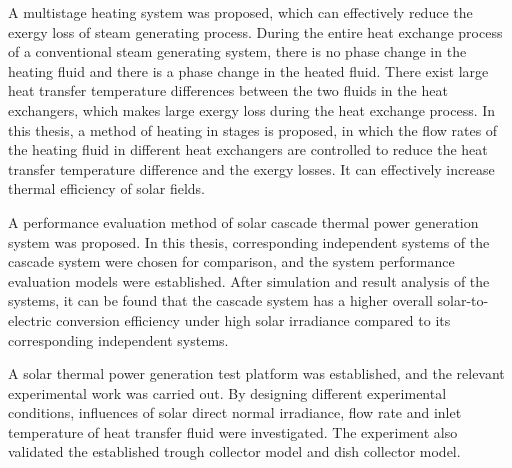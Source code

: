 {A multistage heating system was proposed, which can effectively reduce the exergy loss of steam generating process. During the entire heat exchange process of a conventional steam generating system, there is no phase change in the heating fluid and there is a phase change in the heated fluid. There exist large heat transfer temperature differences between the two fluids in the heat exchangers, which makes large exergy loss during the heat exchange process. In this thesis, a method of heating in stages is proposed, in which the flow rates of the heating fluid in different heat exchangers are controlled to reduce the heat transfer temperature difference and the exergy losses. It can effectively increase thermal efficiency of solar fields.

A performance evaluation method of solar cascade thermal power generation system was proposed. In this thesis, corresponding independent systems of the cascade system were chosen for comparison, and the system performance evaluation models were established. After simulation and result analysis of the systems, it can be found that the cascade system has a higher overall solar-to-electric conversion efficiency under high solar irradiance compared to its corresponding independent systems.

A solar thermal power generation test platform was established, and the relevant experimental work was carried out. By designing different experimental conditions, influences of solar direct normal irradiance, flow rate and inlet temperature of heat transfer fluid were investigated.
The experiment also validated the established trough collector model and dish collector model.


}
